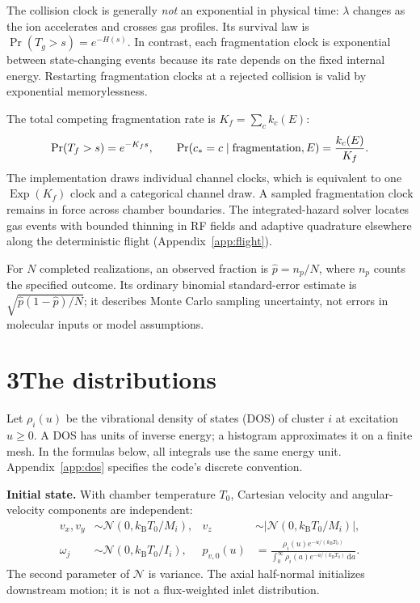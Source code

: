 \documentclass[10pt,a4paper]{article}
\newcommand{\dd}{\,\mathrm d}
\newcommand{\kb}{k_{\mathrm B}}
\newcommand{\Normal}{\mathcal N}
\newcommand{\Exp}{\operatorname{Exp}}
\newcommand{\overview}[2]{\section*{#1\quad #2}\addcontentsline{toc}{section}{#1 #2}}
\begin{document}
The collision clock is generally \emph{not} an exponential in physical time:
$\lambda$ changes as the ion accelerates and crosses gas profiles. Its survival
law is $\Pr(T_g>s)=e^{-H(s)}$. In contrast, each fragmentation clock is exponential
between state-changing events because its rate depends on the fixed internal
energy. Restarting fragmentation clocks at a rejected collision is valid by
exponential memorylessness.

The total competing fragmentation rate is $K_f=\sum_c k_c(E)$:
\[
 \Pr(T_f>s)=e^{-K_fs},\qquad
 \Pr(c_*=c\mid\hbox{fragmentation},E)=\frac{k_c(E)}{K_f}.
\]
The implementation draws individual channel clocks, which is equivalent to
one $\Exp(K_f)$ clock and a categorical channel draw. A sampled fragmentation
clock remains in force across chamber boundaries. The integrated-hazard solver
locates gas events with bounded thinning in RF fields and adaptive quadrature elsewhere along the deterministic flight
(Appendix~\ref{app:flight}).

For $N$ completed realizations, an observed fraction is $\widehat p=n_p/N$,
where $n_p$ counts the specified outcome. Its ordinary binomial standard-error
estimate is $\sqrt{\widehat p(1-\widehat p)/N}$; it describes Monte Carlo sampling
uncertainty, not errors in molecular inputs or model assumptions.

\clearpage
\overview{3}{The distributions}
Let $\rho_i(u)$ be the vibrational density of states (DOS) of cluster $i$ at
excitation $u\geq0$. A DOS has units of inverse energy; a histogram approximates
it on a finite mesh. In the formulas below, all integrals use the same energy
unit. Appendix~\ref{app:dos} specifies the code's discrete convention.

\textbf{Initial state.} With chamber temperature $T_0$, Cartesian velocity and
angular-velocity components are independent:
\begin{align}
 v_x,v_y&\sim\Normal(0,\kb T_0/M_i),&
 v_z&\sim|\Normal(0,\kb T_0/M_i)|,\label{eq:initv}\\
 \omega_j&\sim\Normal(0,\kb T_0/I_i),&
 p_{v,0}(u)&=\frac{\rho_i(u)e^{-u/(\kb T_0)}}
 {\int_0^\infty\rho_i(a)e^{-a/(\kb T_0)}\dd a}.\label{eq:initomega}
\end{align}
The second parameter of $\Normal$ is variance. The axial half-normal initializes
downstream motion; it is not a flux-weighted inlet distribution.
\end{document}
